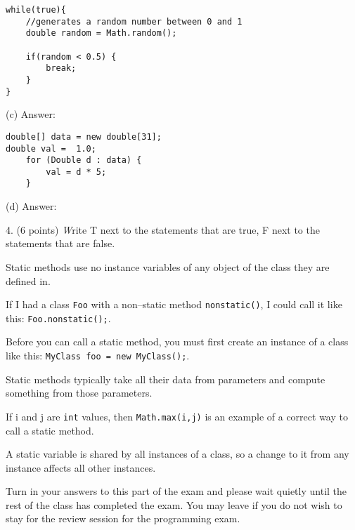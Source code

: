\documentclass[12pt,twoside]{article}
\newcommand{\fillInBlank}[1][0.5in]{\underline{\hspace{#1}}}
\newcommand{\code}[1]{\texttt{#1}}
\begin{document}
\hfill
\begin{minipage}{0.58\linewidth}
\begin{lstlisting}
while(true){
	//generates a random number between 0 and 1
	double random = Math.random();

	if(random < 0.5) {
		break;
	}
}
\end{lstlisting}
\end{minipage}
\hspace{0.25in}
\begin{minipage}[t]{0.25\linewidth}
(c) Answer: \fillInBlank
\end{minipage}
\vfill

\hfill
\begin{minipage}{0.58\linewidth}
\begin{lstlisting}
double[] data = new double[31]; 
double val =  1.0;
	for (Double d : data) {
		val = d * 5;
	}
\end{lstlisting}
\end{minipage}
\hspace{0.25in}
\begin{minipage}[t]{0.25\linewidth}
(d) Answer: \fillInBlank
\end{minipage}
\vfill

\clearpage

4. (6 points) {\emph Write T next to the statements that are true, F next to the statements that are false.}

 \fillInBlank Static methods use no instance variables of any object of the class they are defined in.
 
  \fillInBlank If I had a class \code{Foo} with a non--static method \code{nonstatic()}, I could call it like this: \code{Foo.nonstatic();}.
 
  \fillInBlank Before you can call a static method, you must first create an instance of a class like this: \code{MyClass foo = new MyClass();}.

  \fillInBlank Static methods typically take all their data from parameters and compute something from those parameters.
    
\fillInBlank If i and j are \code{int} values, then \code{Math.max(i,j)} is an example of a correct way to call a static method.

\fillInBlank A static variable is shared by all instances of a class, so a change to it from any instance affects all other instances.

\vfill
\vfill

\begin{center}
{\Large Turn in your answers to this part of the exam and please wait quietly until the rest of the class has completed the exam. You may leave if you do not wish to stay for the review session for the programming exam.}
\end{center}
\end{document}
